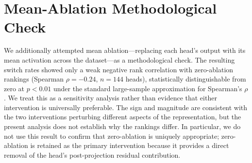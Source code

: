 \documentclass[11pt]{article}
\begin{document}
\section{Mean-Ablation Methodological Check}
\label{app:limitations}

We additionally attempted mean ablation---replacing each head's output
with its mean activation across the dataset---as a methodological
check. The resulting switch rates showed only a weak negative rank correlation with
zero-ablation rankings (Spearman $\rho{=}{-}0.24$, $n{=}144$ heads),
statistically distinguishable from zero at $p{<}0.01$ under the standard
large-sample approximation for Spearman's $\rho$. We treat this as a
sensitivity analysis rather than evidence that either intervention is
universally preferable. The sign and magnitude are consistent with the two
interventions perturbing different aspects of the representation, but the
present analysis does not establish why the rankings differ. In particular,
we do not use this result to confirm that zero-ablation is uniquely
appropriate; zero-ablation is retained as the primary intervention because it
provides a direct removal of the head's post-projection residual contribution.
\end{document}
